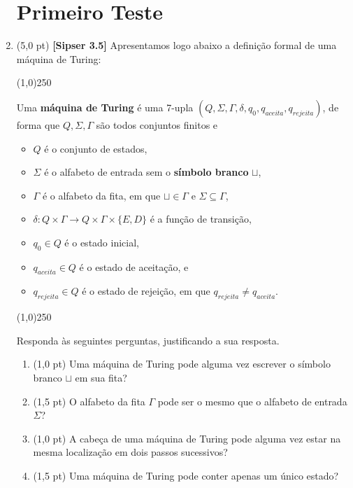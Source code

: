 \documentclass[12pt,a4paper,oneside]{article}
\begin{document}
\begin{enumerate}
	
	\section{Primeiro Teste}
	
	\item (5,0 pt)	{\bf [Sipser 3.5]} Apresentamos logo abaixo a definição formal de uma máquina de Turing:
	
	\begin{center}
		\line(1,0){250}
	\end{center}	
	
	Uma {\bf máquina de Turing} é uma 7-upla $(Q, \Sigma, \Gamma, \delta, q_0, q_{aceita}, q_{rejeita})$, de forma que $Q, \Sigma, \Gamma$ são todos conjuntos finitos e
	
	\begin{itemize}
		\item $Q$ é o conjunto de estados,
		\item $\Sigma$ é o alfabeto de entrada sem o {\bf símbolo branco} $\sqcup$,
		\item $\Gamma$ é o alfabeto da fita, em que $\sqcup \in \Gamma$ e $\Sigma \subseteq \Gamma$,
		\item $\delta : Q \times \Gamma \rightarrow Q \times \Gamma \times \{E, D\}$ é a função de transição,
		\item $q_0 \in Q$ é o estado inicial,
		\item $q_{aceita} \in Q$ é o estado de aceitação, e
		\item $q_{rejeita} \in Q$ é o estado de rejeição, em que $q_{rejeita} \not= q_{aceita}$.
	\end{itemize}
	
	\begin{center}
		\line(1,0){250}
	\end{center}		
	
	Responda às seguintes perguntas, justificando a sua resposta.
	\begin{enumerate}
		\item (1,0 pt) Uma máquina de Turing pode alguma vez escrever o símbolo branco $\sqcup$ em sua fita?
		\item (1,5 pt) O alfabeto da fita $\Gamma$ pode ser o mesmo que o alfabeto de entrada $\Sigma$?
		\item (1,0 pt) A cabeça de uma máquina de Turing pode alguma vez estar na mesma localização em dois passos sucessivos?
		\item (1,5 pt) Uma máquina de Turing pode conter apenas um único estado?
	\end{enumerate}


\end{enumerate}
\end{document}
